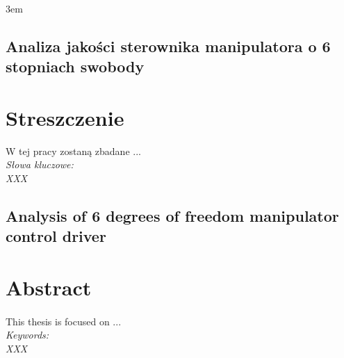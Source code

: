 \documentclass[a4paper, 12pt, twoside]{article}
\begin{document}
\emergencystretch 3em

\begin{figure}
\setlength{\voffset}{0cm}
\setlength{\hoffset}{0cm}
	
\setlength{\voffset}{-2.54cm}
\setlength{\hoffset}{-2.54cm}
\end{figure}
\mbox{}
\newpage
\thispagestyle{empty}
\mbox{}

\newpage
\begin{center}
\section*{Analiza jakości sterownika manipulatora o 6 stopniach swobody}
\end{center}

\section*{Streszczenie}
\thispagestyle{empty}
\justify
W tej pracy zostaną zbadane ...
\vspace{0.5 cm}
\\
\textit{Słowa kluczowe:}
\\
\textit{XXX}


\newpage
\begin{center}
\section*{Analysis of 6 degrees of freedom manipulator control driver}
\end{center}
\thispagestyle{empty}
\section*{Abstract}
\paragraph{}This thesis is focused on ...
\vspace{0.5 cm}
\\
\textit{Keywords:}
\\
\textit{XXX}

\newpage


\end{document}
